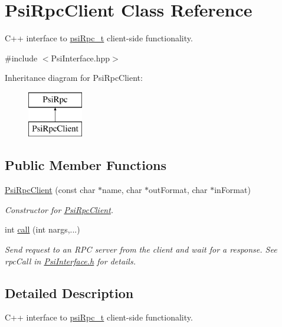 \hypertarget{classPsiRpcClient}{}\section{Psi\+Rpc\+Client Class Reference}
\label{classPsiRpcClient}


C++ interface to \hyperlink{structpsiRpc__t}{psi\+Rpc\+\_\+t} client-\/side functionality.  




{\ttfamily \#include $<$Psi\+Interface.\+hpp$>$}

Inheritance diagram for Psi\+Rpc\+Client\+:\begin{figure}[H]
\begin{center}
\leavevmode
\includegraphics[height=2.000000cm]{classPsiRpcClient}
\end{center}
\end{figure}
\subsection*{Public Member Functions}
\begin{DoxyCompactItemize}
\item 
\hyperlink{classPsiRpcClient_a77a4dd609c4bd82862bea5fc0651ba02}{Psi\+Rpc\+Client} (const char $\ast$name, char $\ast$out\+Format, char $\ast$in\+Format)
\begin{DoxyCompactList}\small\item\em Constructor for \hyperlink{classPsiRpcClient}{Psi\+Rpc\+Client}. \end{DoxyCompactList}\item 
int \hyperlink{classPsiRpcClient_a214010682c81e31783a62773f7b9f788}{call} (int nargs,...)
\begin{DoxyCompactList}\small\item\em Send request to an R\+PC server from the client and wait for a response. See rpc\+Call in \hyperlink{PsiInterface_8h_source}{Psi\+Interface.\+h} for details. \end{DoxyCompactList}\end{DoxyCompactItemize}


\subsection{Detailed Description}
C++ interface to \hyperlink{structpsiRpc__t}{psi\+Rpc\+\_\+t} client-\/side functionality. 

